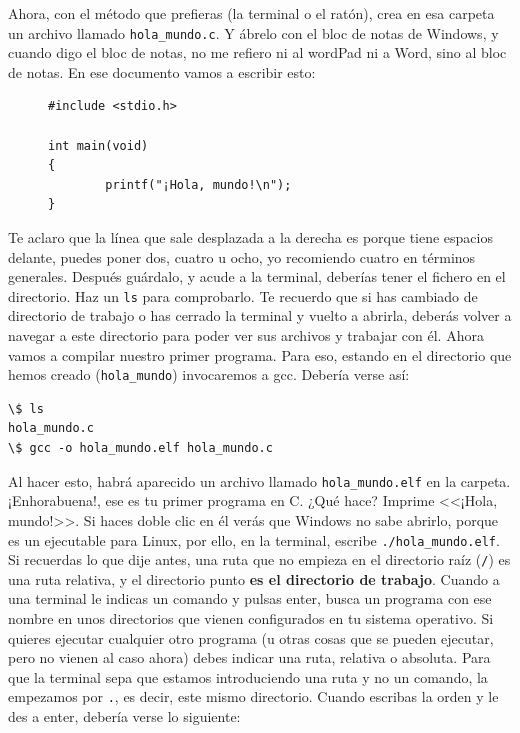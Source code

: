\documentclass[a4paper]{article}
\begin{document}
Ahora, con el método que prefieras (la terminal o el ratón), crea en esa
carpeta un archivo llamado \verb!hola_mundo.c!. Y ábrelo con el bloc de notas
de Windows, y cuando digo el bloc de notas, no me refiero ni al wordPad ni a
Word, sino al bloc de notas. En ese documento vamos a escribir esto:

\begin{figure}[H]
\begin{verbatim}
#include <stdio.h>

int main(void)
{
        printf("¡Hola, mundo!\n");
}
\end{verbatim}
\end{figure}

Te aclaro que la línea que sale desplazada a la derecha es porque tiene
espacios delante, puedes poner dos, cuatro u ocho, yo recomiendo cuatro en
términos generales.
Después guárdalo, y acude a la terminal, deberías tener el fichero en el
directorio. Haz un \verb!ls! para comprobarlo. Te recuerdo que si has
cambiado de directorio de trabajo o has cerrado la terminal y vuelto a abrirla,
deberás volver a navegar a este directorio para poder ver sus archivos y
trabajar con él.
Ahora vamos a compilar nuestro
primer programa. Para eso, estando en el directorio que hemos creado
(\verb!hola_mundo!) invocaremos a gcc. Debería verse así:


\noindent
\begin{minipage}[H]{\linewidth}
\mbox{}
\begin{lstlisting}[style=terminalStyle]
\$ ls
hola_mundo.c
\$ gcc -o hola_mundo.elf hola_mundo.c
\end{lstlisting}
\end{minipage}


Al hacer esto, habrá aparecido un archivo llamado \verb!hola_mundo.elf! en la
carpeta. ¡Enhorabuena!, ese es tu primer programa en C. ¿Qué hace? Imprime
<<¡Hola, mundo!>>. Si haces doble clic en él verás que Windows no sabe abrirlo,
porque es un ejecutable para Linux, por ello, en la terminal, escribe
\verb!./hola_mundo.elf!. Si recuerdas lo que dije antes, una ruta que no empieza
en el directorio raíz (\verb!/!) es una ruta relativa, y el directorio punto
\textbf{es el directorio de trabajo}. Cuando a una terminal le indicas un
comando y pulsas enter, busca un programa con ese nombre en unos directorios
que vienen configurados en tu sistema operativo. Si quieres ejecutar cualquier
otro programa (u otras cosas que se pueden ejecutar, pero no vienen al caso
ahora) debes indicar una ruta, relativa o absoluta. Para que la terminal
sepa que estamos introduciendo una ruta y no un comando, la empezamos por
\verb!.!, es decir, este mismo directorio. Cuando escribas la orden y le des
a enter, debería verse lo siguiente:
\end{document}
